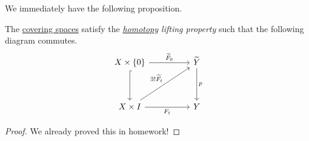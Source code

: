 We immediately have the following proposition.
\begin{proposition}\label{prop:homotopy-lifting-property}
	The \hyperref[def:covering-space]{covering spaces} satisfy the \emph{\hyperref[def:homotopy]{homotopy} lifting property} such that
	the following diagram commutes.
	\[
		\begin{tikzcd}
			{X\times \{0\}} && {\widetilde{Y} } \\
			\\
			{X\times I} && Y
			\arrow["{F_t}"', from=3-1, to=3-3]
			\arrow[hook, from=1-1, to=3-1]
			\arrow["{\widetilde{F}_0 }", from=1-1, to=1-3]
			\arrow["p", from=1-3, to=3-3]
			\arrow["{\exists ! \widetilde{F}_t }", from=3-1, to=1-3]
		\end{tikzcd}
	\]
\end{proposition}
\begin{proof}
	We already proved this in homework!
\end{proof}

